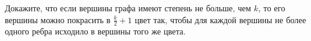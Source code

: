 Докажите, что если вершины графа имеют степень не больше, чем $k$, то его вершины можно покрасить в
$\frac{k}{2} + 1$ цвет так, чтобы для каждой вершины не более одного ребра исходило в вершины того же
цвета.
